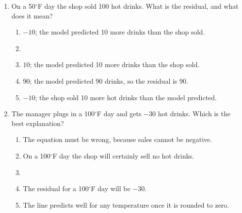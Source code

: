 \documentclass[12pt]{article}
\begin{document}
\begin{enumerate}[leftmargin=1.9em, itemsep=0.05in]

  \item On a 50$^\circ$F day the shop sold 100 hot drinks. What is the residual, and what
        does it mean?
        \begin{enumerate}[label=\textbf{(\Alph*)}, leftmargin=2.2em, itemsep=0pt]
          \item $-10$; the model predicted 10 more drinks than the shop sold.
          \item {}
          \item $10$; the model predicted 10 more drinks than the shop sold.
          \item $90$; the model predicted 90 drinks, so the residual is 90.
          \item $-10$; the shop sold 10 more hot drinks than the model predicted.
                \hfill{}\rule[-0.2in]{0pt}{0.48in}
        \end{enumerate}

  \item The manager plugs in a 100$^\circ$F day and gets $-30$ hot drinks. Which is the best
        explanation?
        \begin{enumerate}[label=\textbf{(\Alph*)}, leftmargin=2.2em, itemsep=0pt]
          \item The equation must be wrong, because sales cannot be negative.
          \item On a 100$^\circ$F day the shop will certainly sell no hot drinks.
          \item {}
          \item The residual for a 100$^\circ$F day will be $-30$.
          \item The line predicts well for any temperature once it is rounded to zero.
                \hfill{}\rule[-0.2in]{0pt}{0.48in}
        \end{enumerate}

\end{enumerate}

\vspace{0.02in}
\end{document}

